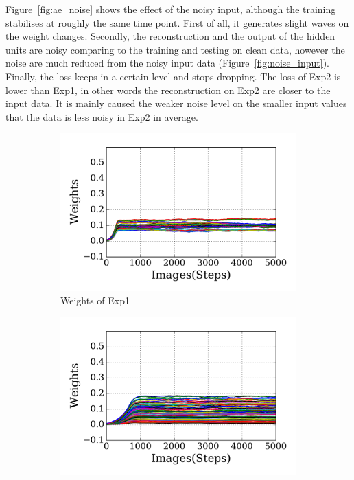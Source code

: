 Figure~\ref{fig:ae_noise} shows the effect of the noisy input, although the training stabilises at roughly the same time point.
First of all, it generates slight waves on the weight changes.
Secondly, the reconstruction and the output of the hidden units are noisy comparing to the training and testing on clean data, however the noise are much reduced from the noisy input data (Figure~\ref{fig:noise_input}). 
Finally, the loss keeps in a certain level and stops dropping.
The loss of Exp2 is lower than Exp1, in other words the reconstruction on Exp2 are closer to the input data.
It is mainly caused the weaker noise level on the smaller input values that the data is less noisy in Exp2 in average. 
\begin{figure}
	\centering
	\begin{subfigure}[t]{0.45\textwidth}
		\includegraphics[width=\textwidth]{pics_sdlm/30_exp_RBM/exp1_weights_non.pdf}
		\caption{Weights of Exp1}
	\end{subfigure}
	\begin{subfigure}[t]{0.45\textwidth}
		\includegraphics[width=\textwidth]{pics_sdlm/30_exp_RBM/exp2_weights_non.pdf}

\end{subfigure}
\end{figure}
